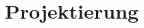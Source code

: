 \documentclass[../../Bachelorarbeit.tex]{subfiles}
\begin{document}
\section{Projektierung}

\blindtext[1]
\end{document}
